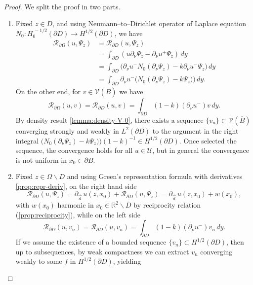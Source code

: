 \documentclass[10pt, a4paper, twoside, openright]{book}
\theoremstyle{definition}
\theoremstyle{plain}
\theoremstyle{plain}
\theoremstyle{plain}
\theoremstyle{plain}
\theoremstyle{plain}
\theoremstyle{plain}
\theoremstyle{plain}
\theoremstyle{plain}
\begin{document}
\begin{proof}
We split the proof in two parts.
 \begin{enumerate}
  \item Fixed $z \in D$, and using Neumann--to--Dirichlet operator of Laplace equation ${N_0}:H^{\,-1/2}_0(\partial D)\to H^{1/2}(\partial D)$,
    we have
    \begin{align}
    \mathcal{R}_{\partial \Omega}(u,\Psi_z) &= \mathcal{R}_{\partial D}(u,\Psi_z) \\
    &= \int_{\partial D}(u\partial_\nu\Psi_z - \partial_\nu u^+ \Psi_z) \,dy\\
    &= \int_{\partial D}\bigl(\partial_\nu u^- {N_0}(\partial_\nu\Psi_z) - k \partial_\nu u^- \Psi_z\bigr) \,dy \\
    &= \int_{\partial D}\partial_\nu u^-\Big( {N_0}(\partial_\nu\Psi_z) - k \Psi_z)\Big) \,dy.
    \end{align}
  On the other end, for $v\in\mathcal{V}(\overline{B})$ we have
  \begin{equation}
   \mathcal{R}_{\partial \Omega}(u,v) = \mathcal{R}_{\partial D}(u,v) = \int_{\partial D}(1-k)(\partial_\nu u^- )v\,dy.
  \end{equation}
  By density result \ref{lemma:density-V-0}, there exists a sequence $\{v_n\}\subset \mathcal{V}(\overline{B})$ converging strongly and weakly in $L^2(\partial D)$ to the argument in the right integral $\bigl( {N_0}(\partial_\nu\Psi_z) - k \Psi_z)\bigr)(1-k)^{-1}\in H^{1/2}(\partial D)$.
  Once selected the sequence, the convergence holds for all $u\in\mathcal{U}$, but in general the convergence is not uniform in $x_0\in \partial B$.
  \item Fixed $z \in \Omega\backslash D$ and using Green's representation formula with derivatives \eqref{prop:repr-deriv}, on the right hand side
  \begin{equation}
   \mathcal{R}_{\partial \Omega}(u,\Psi_z) = \partial_{\vec{d}}\,u(z,x_0) + \mathcal{R}_{\partial D}(u,\Psi_z) = \partial_{\vec{d}}\,u(z,x_0) + w(x_0),
  \end{equation}
  with $w(x_0)$ harmonic in $x_0 \in \mathbb{R}^2\backslash \overline{D}$ by reciprocity relation (\ref{prop:reciprocity}), while on the left side
  \begin{equation}
   \mathcal{R}_{\partial \Omega}(u,v_n) = \mathcal{R}_{\partial D}(u,v_n) = \int_{\partial D}(1-k)(\partial_\nu u^- )v_n\,dy.
  \end{equation}
  If we assume the existence of a bounded sequence $\{v_n\} \subset H^{1/2}(\partial D)$, then up to subsequences, by weak compactness we can extract $v_n$ converging weakly to some $f$ in $H^{1/2}(\partial D)$, yielding

\end{enumerate}
\end{proof}
\end{document}
